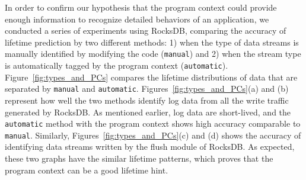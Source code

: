 In order to confirm our hypothesis that the program context could provide
enough information to recognize detailed behaviors of an application, we
conducted a series of experiments using RocksDB, comparing the accuracy of
lifetime prediction by two different methods: 1) when the type of data streams
is manually identified by modifying the code (\texttt{manual}) and 2) when the
stream type is automatically tagged by the program context
(\texttt{automatic}).  Figure~\ref{fig:types_and_PCs} compares the lifetime
distributions of data that are separated by \texttt{manual} and
\texttt{automatic}.  Figures~\ref{fig:types_and_PCs}(a) and (b) represent how
well the two methods identify log data from all the write traffic generated by
RocksDB.  As mentioned earlier, log data are short-lived, and the
\texttt{automatic} method with the program context shows high accuracy
comparable to \texttt{manual}. Similarly, Figures~\ref{fig:types_and_PCs}(c)
and (d) shows the accuracy of identifying data streams written by the flush
module of RocksDB.  As expected, these two graphs have the similar lifetime
patterns, which proves that the program context can be a good lifetime hint.







